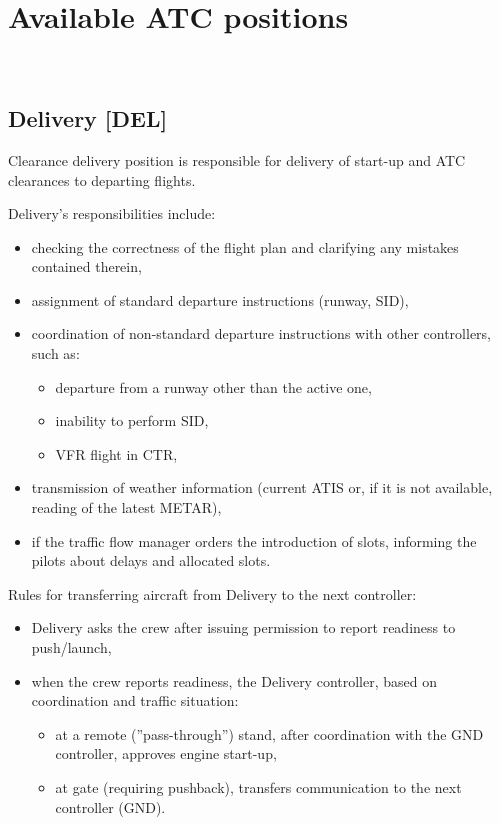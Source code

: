 \chapter{Available ATC positions}\
\section{Delivery [DEL]}

\cbstart%
Clearance delivery position is responsible for delivery of start-up and ATC clearances to departing flights.
\cbend%

Delivery's responsibilities include:
\begin{itemize}
    \item checking the correctness of the flight plan and clarifying any mistakes contained therein,
    \item assignment of standard departure instructions (runway, SID),
    \item coordination of non-standard departure instructions with other controllers, such as:
    \begin{itemize}
        \item departure from a runway other than the active one,
        \item inability to perform SID,
        \item VFR flight in CTR,
    \end{itemize}
    \item transmission of weather information (current ATIS or, if it is not available, reading of the latest METAR),
    \item if the traffic flow manager orders the introduction of slots, informing the pilots about delays and allocated slots.
\end{itemize}

Rules for transferring aircraft from Delivery to the next controller:
\begin{itemize}
    \item Delivery asks the crew after issuing permission to report readiness to push/launch,
    \item when the crew reports readiness, the Delivery controller, based on coordination and traffic situation:
    \begin{itemize}
        \item at a remote (''pass-through'') stand, after coordination with the GND controller, approves engine start-up,
        \item at gate (requiring pushback), transfers communication to the next controller (GND).
    \end{itemize}
\end{itemize}

